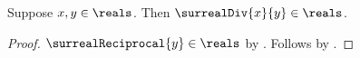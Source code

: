 \begin{theorem}\label{surreal_real_division_closed}
    Suppose $x,y\in\reals$.
    Then $\surrealDiv{x}{y}\in\reals$.
\end{theorem}
\begin{proof}
    $\surrealReciprocal{y}\in\reals$
        by .
    Follows by
        .
\end{proof}

